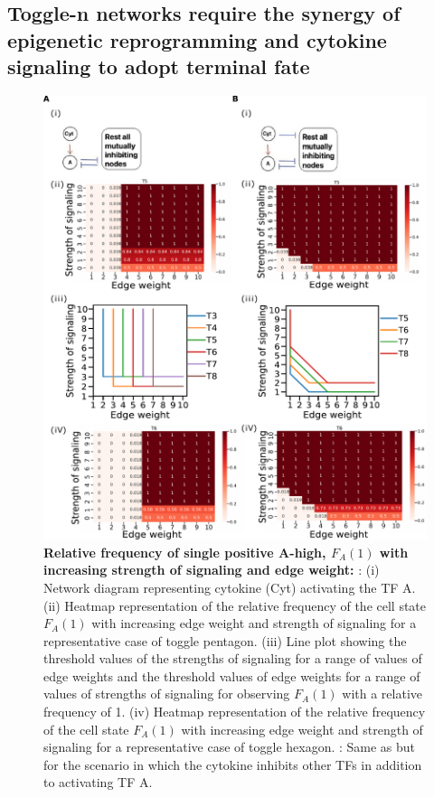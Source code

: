 \documentclass[11pt,a4paper]{article}
\theoremstyle{definition}
\theoremstyle{remark}
\begin{document}
\subsection{Toggle-n networks require the synergy of epigenetic reprogramming and cytokine signaling to adopt terminal fate}
\begin{figure}[!ht]
    \centering
    \begin{subfigure}[c]{\textwidth}
        \label{cyt-actA}
    \end{subfigure}
    \begin{subfigure}[c]{\textwidth}
        \label{cyt-actA-inh}
    \end{subfigure}
    \includegraphics[width=\textwidth]{figures/Signalling}
    \caption{\textbf{Relative frequency of single positive A-high, $F_A(1)$ with increasing strength of signaling and edge weight:} : (i) Network diagram representing cytokine (Cyt) activating the TF A. (ii) Heatmap representation of the relative frequency of the cell state $F_A(1)$ with increasing edge weight and strength of signaling for a representative case of toggle pentagon. (iii) Line plot showing the threshold values of the strengths of signaling for a range of values of edge weights and the threshold values of edge weights for a range of values of strengths of signaling for observing $F_A(1)$ with a relative frequency of 1. (iv) Heatmap representation of the relative frequency of the cell state $F_A(1)$ with increasing edge weight and strength of signaling for a representative case of toggle hexagon. : Same as  but for the scenario in which the cytokine inhibits other TFs in addition to activating TF A.}
    \label{progressive}
\end{figure}
\end{document}
